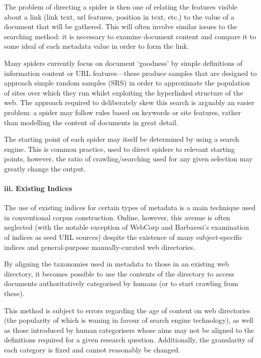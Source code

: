 The problem of directing a spider is then one of relating the features visible about a link (link text, url features, position in text, etc.) to the value of a document that will be gathered.  This will often involve similar issues to the searching method: it is necessary to examine document content and compare it to some ideal of each metadata value in order to form the link.

Many spiders currently focus on document `goodness' by simple definitions of information content or URL features\cite{schafer2014focused,ferraresi2008introducing,belikov2013big}---these produce samples that are designed to approach simple random samples (SRS) in order to approximate the population of sites over which they run whilst exploiting the hyperlinked structure of the web.  The approach required to deliberately skew this search is arguably an easier problem: a spider may follow rules based on keywords or site features, rather than modelling the content of documents in great detail.

The starting point of each spider may itself be determined by using a search engine.  This is common practice, used to direct spiders to relevant starting points, however, the ratio of crawling/searching used for any given selection may greatly change the output.



\paragraph{iii. Existing Indices}
The use of existing indices for certain types of metadata is a main technique used in conventional corpus construction.  Online, however, this avenue is often neglected (with the notable exception of WebCorp\cite{renouf2003webcorp} and Barbaresi's examination of indices as seed URL sources\cite{barbaresi2014finding}) despite the existence of many subject-specific indices and general-purpose manually-curated web directories.

By aligning the taxonomies used in metadata to those in an existing web directory, it becomes possible to use the contents of the directory to access documents authoritatively categorised by humans (or to start crawling from these).

This method is subject to errors regarding the age of content on web directories (the popularity of which is waning in favour of search engine technology), as well as those introduced by human categorisers whose aims may not be aligned to the definitions required for a given research question.  Additionally, the granularity of each category is fixed and cannot reasonably be changed.

